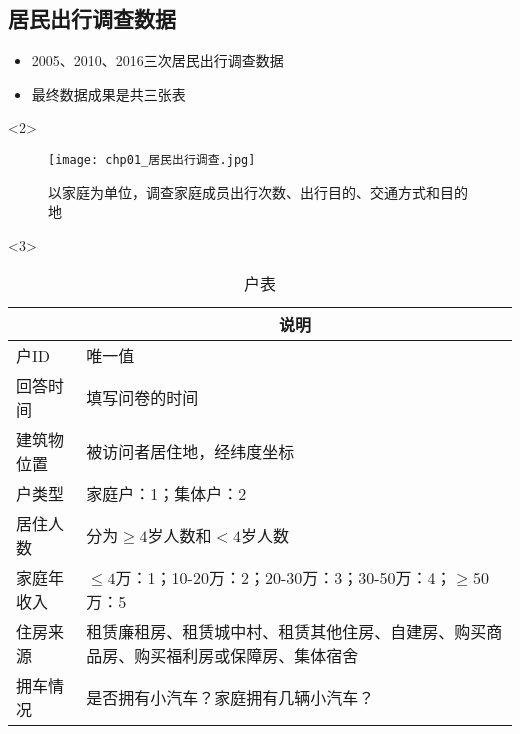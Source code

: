 \subsection{居民出行调查数据}

\begin{frame}[t]{\subsecname}
\begin{itemize}
\item<2-> 2005、2010、2016三次居民出行调查数据
\item<3-> 最终数据成果是共三张表
\end{itemize}

\begin{overlayarea}{\textwidth}{\textheight}
  \begin{onlyenv}<2>
\begin{figure}
  \centering
  \texttt{[image: chp01\_居民出行调查.jpg]}
  \caption{以家庭为单位，调查家庭成员出行次数、出行目的、交通方式和目的地}
\end{figure}
  \end{onlyenv}

\begin{onlyenv}<3>
  \begin{table} \centering \footnotesize
    \begin{tabular}{|>{\centering\arraybackslash} m{}|m{}|}
      \toprule
      \rowcolor{LightCyan}
      \multicolumn{1}{|c|}{\textbf{主要字段}} & \multicolumn{1}{c|}{\textbf{说明}} \\\hline
      户ID & 唯一值\\\hline
      回答时间 & 填写问卷的时间\\\hline
      建筑物位置 & 被访问者居住地，经纬度坐标\\\hline
      户类型 & 家庭户：1；集体户：2\\\hline
      居住人数 & 分为$\geq{4}$岁人数和$<4$岁人数\\\hline
      家庭年收入 & $\leq{4}$万：1；10-20万：2；20-30万：3；30-50万：4；$\geq{50}$万：5\\\hline
      住房来源 & 租赁廉租房、租赁城中村、租赁其他住房、自建房、购买商品房、购买福利房或保障房、集体宿舍\\\hline
      拥车情况 & 是否拥有小汽车？家庭拥有几辆小汽车？\\\hline
      \bottomrule
    \end{tabular}
    \caption{户表}
  \end{table}
\end{onlyenv}


\end{overlayarea}
\end{frame}
